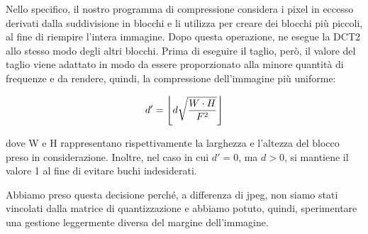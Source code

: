 Nello specifico, il nostro programma di compressione considera i pixel in eccesso derivati dalla suddivisione in blocchi e li utilizza per creare dei blocchi più piccoli, al fine di riempire l'intera immagine. Dopo questa operazione, ne esegue la DCT2 allo stesso modo degli altri blocchi. Prima di eseguire il taglio, però, il valore del taglio viene adattato in modo da essere proporzionato alla minore quantità di frequenze e da rendere, quindi, la compressione dell'immagine più uniforme:

$$d' = \floor*{d  \sqrt{ \frac{W \cdot H}{F^{2}}}}$$

dove W e H rappresentano rispettivamente la larghezza e l'altezza del blocco preso in considerazione.
Inoltre, nel caso in cui $d'=0$, ma $d>0$, si mantiene il valore 1 al fine di evitare buchi indesiderati.

Abbiamo preso questa decisione perché, a differenza di jpeg, non siamo stati vincolati dalla matrice di quantizzazione e abbiamo potuto, quindi, sperimentare una gestione leggermente diversa del margine dell'immagine.


